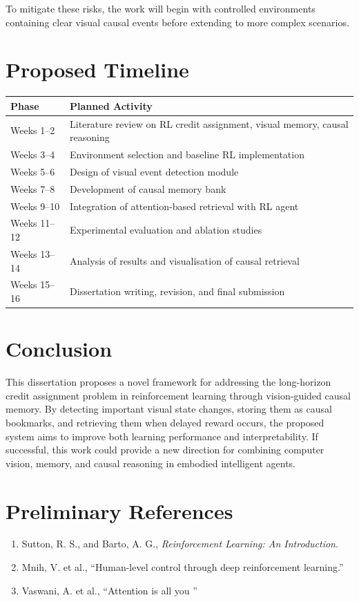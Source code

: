 \documentclass[12pt,a4paper]{article}
\begin{document}
To mitigate these risks, the work will begin with controlled environments containing clear visual causal events before extending to more complex scenarios.

\section{Proposed Timeline}

\begin{center}
\begin{tabular}{@{}p{4cm}p{9cm}@{}}
\toprule
\textbf{Phase} & \textbf{Planned Activity} \\
\midrule
Weeks 1--2 & Literature review on RL credit assignment, visual memory, causal reasoning \\
Weeks 3--4 & Environment selection and baseline RL implementation \\
Weeks 5--6 & Design of visual event detection module \\
Weeks 7--8 & Development of causal memory bank \\
Weeks 9--10 & Integration of attention-based retrieval with RL agent \\
Weeks 11--12 & Experimental evaluation and ablation studies \\
Weeks 13--14 & Analysis of results and visualisation of causal retrieval \\
Weeks 15--16 & Dissertation writing, revision, and final submission \\
\bottomrule
\end{tabular}
\end{center}

\section{Conclusion}

This dissertation proposes a novel framework for addressing the long-horizon credit assignment problem in reinforcement learning through vision-guided causal memory. By detecting important visual state changes, storing them as causal bookmarks, and retrieving them when delayed reward occurs, the proposed system aims to improve both learning performance and interpretability. If successful, this work could provide a new direction for combining computer vision, memory, and causal reasoning in embodied intelligent agents.

\section{Preliminary References}

\begin{enumerate}
    \item Sutton, R. S., and Barto, A. G., \textit{Reinforcement Learning: An Introduction}.
    \item Mnih, V. et al., ``Human-level control through deep reinforcement learning.''
    \item Vaswani, A. et al., ``Attention is all you '' 
\end{enumerate}
\end{document}
